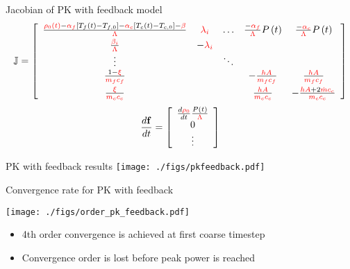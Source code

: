 \documentclass[serif]{beamer}
\begin{document}
\begin{frame}{Jacobian of PK with feedback model}
  \small
  \begin{equation}
    \nonumber
    \mathbb{J} = \left[
    \begin{array}{ccccc}
      \frac{{\color{red}\rho_0\left(t\right)} - {\color{red}\alpha_f}\left[T_f\left(t\right) - T_{f,0}\right] - {\color{red}\alpha_c}\left[T_c\left(t\right) - 
    T_{c,0}\right]- {\color{red}{\beta}}}{{\color{red}\Lambda}} & \color{red}\lambda_i & \hdots & \frac{-\color{red}\alpha_f}{\color{red}\Lambda}P\left(t\right) 
    & \frac{-\color{red}\alpha_c}{\color{red}\Lambda}P\left(t\right) \vspace{0.1cm}\\
    
    \frac{{\color{red}\beta_i}}{{\color{red}\Lambda}} & -{\color{red}\lambda_i} \\
    
    \vdots & & \ddots \\
    
    \frac{1-{\color{red}\xi}}{{\color{red}m_fc_f}} & & & -\frac{\color{red}hA}{\color{red}m_fc_f} & \frac{\color{red}hA}{\color{red}m_fc_f} \vspace{0.1cm} \\
    
    \frac{{\color{red}\xi}}{{\color{red}m_cc_c}} & & & \frac{\color{red}hA}{\color{red}m_cc_c} & -\frac{{\color{red}hA} + 2\color{red}\dot{m}c_c}{\color{red}m_cc_c}
    \end{array}\right]
  \end{equation} \vfill
  \begin{equation}
    \nonumber
     \frac{d\mathbf{f}}{dt} = \left[\begin{array}{c}
                        \frac{d\color{red}\rho_0}{dt}\frac{P\left(t\right)}{\color{red}\Lambda} \\
                        0 \\
                        \vdots
                      \end{array}\right]
  \end{equation}
\end{frame}

\begin{frame}{PK with feedback results}
  \texttt{[image: ./figs/pkfeedback.pdf]}
\end{frame}

\begin{frame}{Convergence rate for PK with feedback}
  \begin{center}
  \texttt{[image: ./figs/order\_pk\_feedback.pdf]}
  \end{center}
    \begin{itemize}
   \item 4th order convergence is achieved at first coarse timestep
   \item Convergence order is lost before peak power is reached
   \end{itemize}
\end{frame}
\end{document}
